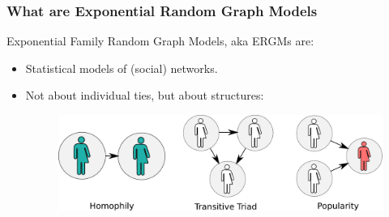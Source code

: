 \documentclass[aspectratio=169, 9pt, handout]{beamer}
\begin{document}

\begin{frame}
\frametitle{What are Exponential Random Graph Models}

Exponential Family Random Graph Models, aka \alert{ERGMs} are:\pause

\begin{itemize}
\item Statistical models of (social) networks.\pause
\item Not about individual ties, but about structures:\pause
\begin{figure}
\includegraphics[width=.6\linewidth]{friendly-terms.pdf}
\end{figure}
\end{itemize}

\end{frame}
\end{document}
